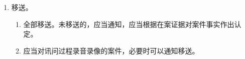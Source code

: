 \begin{enumerate}
\begin{enumerate}
                \begin{enumerate}
                  \item 控方要求。
                        \begin{enumerate}
                          \item {}。
                          \item {}。
                        \end{enumerate}
                  \item 辩方要求。一证明、两认证。
                  \item 共同要求。涉及外国语言、文字，应当提供中文译本。
                \end{enumerate}
        \end{enumerate}
  \item 移送。
        \begin{enumerate}
          \item 全部移送。未移送的，应当通知，应当根据在案证据对案件事实作出认定。
          \item 应当对讯问过程录音录像的案件，必要时可以通知移送。
        \end{enumerate}
\end{enumerate}
